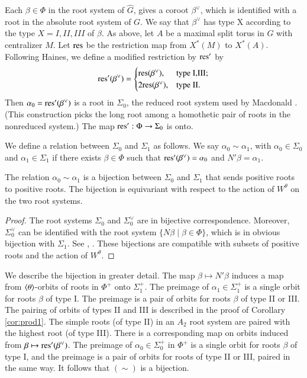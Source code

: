 Each $\beta\in \Phi$ in the root system of $\hat G$, gives a
 coroot $\beta^\vee$, which is identified with a root in the absolute root system of $G$.  
We say that $\beta^\vee$ has type X according to
the type $X=I,II,III$ of $\beta$.  As above, let $A$ be a maximal split torus in $G$ with
centralizer $M$.
Let ${\operatorname{res}}$ be the restriction map from $X^*(M)$ to $X^*(A)$.
Following Haines, we define a modified restriction by ${\operatorname{res}}'$ by
\[
{\operatorname{res}}' (\beta^\vee) = \begin{cases}
{\operatorname{res}}(\beta^\vee), & \text{type I,III};\\
2{\operatorname{res}}(\beta^\vee), & \text{type II}.
\end{cases}
\]
Then $\alpha_0={\operatorname{res}}'(\beta^\vee)$ is a root in $\Sigma_0$, the reduced root system used by Macdonald \cite[Th.B]{haines2016dualities}.
(This construction picks the long root among a homothetic pair
of roots in the nonreduced system.)
The map ${\operatorname{res}}':\Phi\to \Sigma_0$ is onto.

We define a relation between $\Sigma_0$ and $\Sigma_1$ as follows.
We say $\alpha_0\sim\alpha_1$, with $\alpha_0\in\Sigma_0$ and
$\alpha_1\in \Sigma_1$ if there exists $\beta\in \Phi$ such
that ${\operatorname{res}}'(\beta^\vee) = \alpha_0$ and $N'\beta = \alpha_1$.

\begin{lemma}  The relation $\alpha_0\sim\alpha_1$ is a bijection
between $\Sigma_0$ and $\Sigma_1$ that sends positive roots to positive roots.
The bijection is equivariant with respect to the action of $W^\theta$ on the two root
systems.
\end{lemma}

\begin{proof}
The root systems $\Sigma_0$ and $\Sigma_0^\vee$ are in bijective correspondence.
Moreover,  $\Sigma_0^\vee$ can be identified with the root 
system $\{N\beta\mid \beta\in\Phi\}$, which is in
obvious bijection with $\Sigma_1$.
See \cite[Th.A]{haines2016dualities}, 
\cite[1.3.9]{kottwitz1999foundations}.  
These bijections are compatible with subsets of positive roots and the action of $W^\theta$.
\end{proof}

\begin{remark} 
We describe the bijection in
greater detail.
The map $\beta\mapsto N'\beta$ induces a map from $\langle{\theta}\rangle$-orbits of roots in $\Phi^+$
onto $\Sigma^+_1$.  The preimage of $\alpha_1\in\Sigma^+_1$
is a single orbit for roots $\beta$ of type I.  The preimage
is a pair of orbits for roots $\beta$ of type II or III.  The pairing of orbits of types II and III is
described in the proof of Corollary \ref{cor:prod1}.
The simple roots (of type II)
in an $A_2$ root system are paired with the 
highest root (of type III).
There is a corresponding map on orbits induced from $\beta\mapsto {\operatorname{res}}'(\beta^\vee)$.
The preimage of $\alpha_0\in\Sigma^+_0$ in $\Phi^+$ 
is a single orbit for roots $\beta$ of type I, and the preimage is a pair of
orbits for roots of type II or III, paired in the same way.  It follows that $(\sim)$ is a bijection.
\end{remark}


